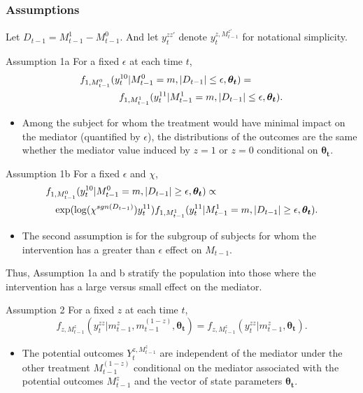 \documentclass{beamer}
\begin{document}
\begin{frame}
\frametitle{Assumptions}
Let $D_{t-1}=M_{t-1}^1-M_{t-1}^0$. And let $y_t^{zz'}$ denote $y_t^{z,M^{z'}_{t-1}}$ for notational simplicity.
\begin{block}{Assumption 1a}
For a fixed $\epsilon$ at each time $t$,
\begin{eqnarray*}
\lefteqn{f_{1,M_{t-1}^0}(y_t^{10}|M_{t-1}^0=m, |D_{t-1}|\leq \epsilon, \boldsymbol{\theta_t})=}\\
& & \quad \quad \quad f_{1,M_{t-1}^1}(y_t^{11}|M_{t-1}^1=m, |D_{t-1}|\leq \epsilon, \boldsymbol{\theta_t}).
\end{eqnarray*}
\end{block}
\begin{itemize}
\item Among the subject for whom the treatment would have minimal
  impact on the mediator (quantified by $\epsilon$), the distributions
  of the outcomes are the same whether the mediator value induced by
  $z=1$ or $z=0$ conditional on $\boldsymbol{\theta_t}$.
\end{itemize}
\end{frame}

\begin{frame}
\begin{block}{Assumption 1b}
For a fixed $\epsilon$ and $\chi$,
\begin{eqnarray*}
\lefteqn{f_{1,M_{t-1}^0}(y_t^{10}|M_{t-1}^0=m, |D_{t-1}|\geq \epsilon, \boldsymbol{\theta_t})\propto}\\
& & \text{exp}(\log(\chi^{sgn(D_{t-1})}) y_t^{11}) f_{1,M_{t-1}^1}(y_t^{11}|M_{t-1}^1=m, |D_{t-1}|\geq \epsilon, \boldsymbol{\theta_t}).
\end{eqnarray*}
\end{block}
\begin{itemize}
\item The second assumption is for the subgroup of subjects for whom the intervention has a greater than $\epsilon$ effect on $M_{t-1}$.
\end{itemize}
Thus, Assumption 1a and b stratify the population into those where the intervention has a large versus small effect on the mediator.
\end{frame}

\begin{frame}
\begin{block}{Assumption 2}
For a fixed $z$ at each time $t$,
\[f_{z,M_{t-1}^z}(y_t^{zz} | m_{t-1}^z, m_{t-1}^{(1-z)}, \boldsymbol{\theta_t}) = f_{z,M_{t-1}^z}(y_t^{zz}|m_{t-1}^z, \boldsymbol{\theta_t}).\]
\end{block}
\begin{itemize}
\item The potential outcomes $Y_t^{z,M_{t-1}^z}$ are independent of the mediator under the other treatment $M_{t-1}^{(1-z)}$ conditional on the mediator associated with the potential outcomes $M_{t-1}^z$ and the vector of state parameters $\boldsymbol{\theta_t}$.
\end{itemize}
\end{frame}
\end{document}
